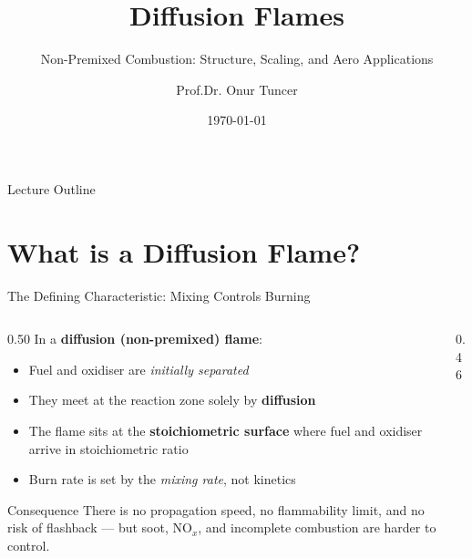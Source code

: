 \documentclass[12pt,aspectratio=169]{beamer}
\title{Diffusion Flames}
\subtitle{Non-Premixed Combustion: Structure, Scaling, and Aero Applications}
\author{Prof.Dr. Onur Tuncer}
\institute{ITU Dept. of Aeronautical Eng.}
\date{\today}
\begin{document}
\begin{frame}
  \titlepage
\end{frame}

\begin{frame}{Lecture Outline}
  \tableofcontents
\end{frame}

\section{What is a Diffusion Flame?}

\begin{frame}{The Defining Characteristic: Mixing Controls Burning}

  \begin{columns}
    \begin{column}{0.50\textwidth}
      In a \textbf{diffusion (non-premixed) flame}:
      \begin{itemize}
        \item Fuel and oxidiser are \emph{initially separated}
        \item They meet at the reaction zone solely by \textbf{diffusion}
        \item The flame sits at the \textbf{stoichiometric surface}
              where fuel and oxidiser arrive in stoichiometric ratio
        \item Burn rate is set by the \emph{mixing rate}, not kinetics
      \end{itemize}
      \vspace{4pt}
      \begin{block}{Consequence}
        There is no propagation speed, no flammability limit,
        and no risk of flashback --- but soot, NO$_x$,
        and incomplete combustion are harder to control.
      \end{block}
    \end{column}
    \begin{column}{0.46\textwidth}
      \centering
\end{column}
\end{columns}
\end{frame}
\end{document}
